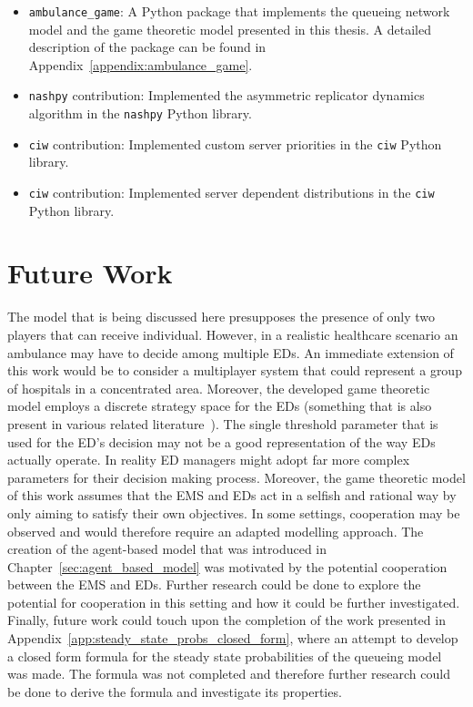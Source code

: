 \begin{itemize}
    \item \texttt{ambulance\_game}: A Python package that implements the
    queueing network model and the game theoretic model presented in this
    thesis.
    A detailed description of the package can be found in
    Appendix~\ref{appendix:ambulance_game}.
    \item \texttt{nashpy} contribution: Implemented the asymmetric replicator
    dynamics algorithm in the \texttt{nashpy} Python library.
    \item \texttt{ciw} contribution: Implemented custom server priorities in
    the \texttt{ciw} Python library.
    \item \texttt{ciw} contribution: Implemented server dependent distributions
    in the \texttt{ciw} Python library.
\end{itemize}




\section{Future Work}

The model that is being discussed here presupposes the presence of only two
players that can receive individual.
However, in a realistic healthcare scenario an ambulance may have to decide
among multiple EDs.
An immediate extension of this work would be to consider a multiplayer system
that could represent a group of hospitals in a concentrated area.
Moreover, the developed game theoretic model employs a discrete strategy space
for the EDs (something that is also present in various related
literature~\cite{deo2011centralized,knight_measuring_poa}).
The single threshold parameter that is used for the ED's decision may not be
a good representation of the way EDs actually operate.
In reality ED managers might adopt far more complex parameters for their
decision making process.
Moreover, the game theoretic model of this work assumes that the EMS and EDs
act in a selfish and rational way by only aiming to satisfy their own
objectives.
In some settings, cooperation may be observed and would therefore require
an adapted modelling approach.
The creation of the agent-based model that was introduced in
Chapter~\ref{sec:agent_based_model} was motivated by the potential cooperation
between the EMS and EDs.
Further research could be done to explore the potential for cooperation in
this setting and how it could be further investigated.
Finally, future work could touch upon the completion of the work presented in
Appendix~\ref{app:steady_state_probs_closed_form}, where an attempt to develop
a closed
form formula for the steady state probabilities of the queueing model was
made.
The formula was not completed and therefore further research could be done to
derive the formula and investigate its properties.
